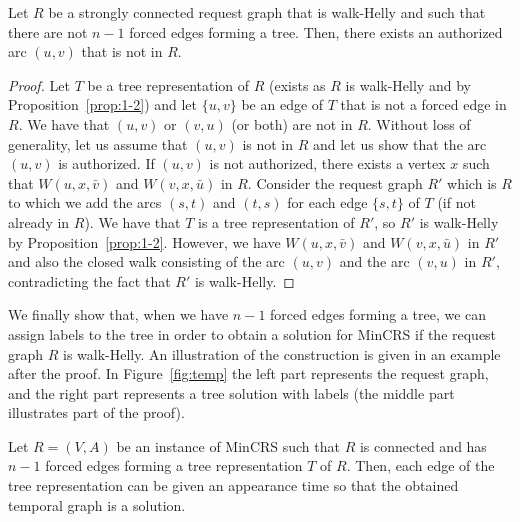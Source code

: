 \documentclass[11pt]{article}%
\begin{document}
\begin{lemma}
\label{lemma:find}
Let $R$ be a strongly connected request graph that is walk-Helly and such that there are not $n-1$ forced edges forming a tree. Then, there exists an authorized arc $(u,v)$ that is not in $R$. 
\end{lemma}

\begin{proof}
Let $T$ be a tree representation of $R$ (exists as $R$ is walk-Helly and by Proposition~\ref{prop:1-2}) and let $\{u,v\}$ be an edge of $T$ that is not a forced edge in $R$. We have that $(u,v)$ or $(v,u)$ (or both) are not in $R$. Without loss of generality, let us assume that $(u,v)$ is not in $R$ and let us show that the arc $(u,v)$ is authorized. If $(u,v)$ is not authorized, there exists a vertex $x$ such that $W(u,x,\bar{v})$ and $W(v,x,\bar{u})$ in $R$. Consider the request graph $R'$ which is $R$ to which we add the arcs $(s,t)$ and $(t,s)$ for each edge $\{s,t\}$ of $T$ (if not already in $R$). We have that $T$ is a tree representation of $R'$, so $R'$ is walk-Helly by Proposition~\ref{prop:1-2}. However, we have $W(u,x,\bar{v})$ and $W(v,x,\bar{u})$ in $R'$ and also the closed walk consisting of the arc $(u,v)$ and the arc $(v,u)$ in $R'$, contradicting the fact that $R'$ is walk-Helly. 
\end{proof}


We finally show that, when we have $n-1$ forced edges forming a tree, we can assign labels to the tree in order to obtain a solution for MinCRS if the request graph $R$ is walk-Helly. An illustration of the construction is given in an example after the proof. In Figure~\ref{fig:temp} the left part represents the request graph, and the right part represents a tree solution with labels (the middle part illustrates part of the proof).

\begin{lemma}
\label{lemma:tempo}
Let $R=(V,A)$ be an instance of MinCRS such that $R$ is connected and has $n-1$ forced edges forming a tree representation $T$ of $R$. Then, each edge of the tree representation can be given an appearance time so that the obtained temporal graph is a solution.  
\end{lemma}
\end{document}
